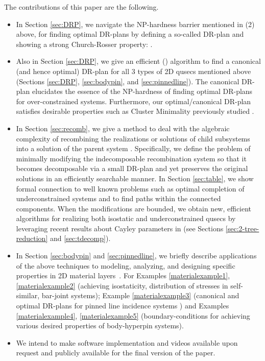The contributions of this paper are the following.
\begin{itemize}
  \item In Section \ref{sec:DRP}, we navigate the NP-hardness barrier mentioned in (2) above, for finding optimal DR-plans by defining a so-called  DR-plan and showing a strong Church-Rosser property: .

  \item Also in Section \ref{sec:DRP}, we give an efficient (\candrpcomplexity) algorithm to find a canonical (and hence optimal) DR-plan for all 3 types of 2D qusecs mentioned above (Sections \ref{sec:DRP}, \ref{sec:bodypin}, and \ref{sec:pinnedline}). The canonical DR-plan elucidates the essence of the NP-hardness of finding optimal DR-plans for over-constrained systems. Furthermore, our optimal/canonical DR-plan satisfies desirable properties such as Cluster Minimality previously studied \cite{hoffman2001decompositionI}.

  \item In Section \ref{sec:recomb}, we give a method to deal with the algebraic complexity of recombining the realizations or solutions of child subsystems into a solution of the parent system \cite{sitharam2010optimized,sitharam2006well,sitharam2010reconciling}. Specifically, we define the problem of minimally modifying the indecomposable recombination system so that it becomes decomposable via a small DR-plan and yet preserves the original solutions in an efficiently searchable manner. In Section \ref{sec:table}, we show formal connection to well known problems such as optimal completion of underconstrained systems \cite{joan-arinyo2003transforming,sitharam2005combinatorial,gao2006ctree} and to find paths within the connected components. When the modifications are bounded, we obtain new, efficient algorithms for realizing both isostatic and underconstrained qusecs by leveraging recent results about Cayley parameters in \cite{sitharam2010convex,sitharam2011cayleyI,sitharam2011cayleyII} (see Sections \ref{sec:2-tree-reduction} and \ref{sec:tdecomp}).

  \item In Section \ref{sec:bodypin} and \ref{sec:pinnedline}, we briefly describe applications of the above techniques to modeling, analyzing, and designing specific properties in 2D material layers~\cite{Jackson2008bodypin}. For Examples \ref{materialexample1}, \ref{materialexample2} (achieving isostaticity, distribution of stresses in self-similar, bar-joint systems); Example \ref{materialexample3} (canonical and optimal DR-plans for pinned line incidence systems \cite{sitharam2014incidence}) and Examples \ref{materialexample4}, \ref{materialexample5} (boundary-conditions for achieving various desired properties of body-hyperpin systems).

  \item We intend to make software implementation and videos available upon request and publicly available for the final version of the paper.
\end{itemize}



